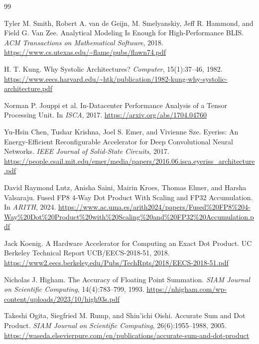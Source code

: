 \documentclass[UTF8,11pt,a4paper]{ctexart}
\begin{document}
\begin{thebibliography}{99}

Tyler M. Smith, Robert A. van de Geijn, M. Smelyanskiy, Jeff R. Hammond, and Field G. Van Zee.
\newblock Analytical Modeling Is Enough for High-Performance BLIS.
\newblock \emph{ACM Transactions on Mathematical Software}, 2018.
\newblock \url{https://www.cs.utexas.edu/~flame/pubs/flawn74.pdf}

H. T. Kung.
\newblock Why Systolic Architectures?
\newblock \emph{Computer}, 15(1):37--46, 1982.
\newblock \url{https://www.eecs.harvard.edu/~htk/publication/1982-kung-why-systolic-architecture.pdf}

Norman P. Jouppi et al.
\newblock In-Datacenter Performance Analysis of a Tensor Processing Unit.
\newblock In \emph{ISCA}, 2017.
\newblock \url{https://arxiv.org/abs/1704.04760}

Yu-Hsin Chen, Tushar Krishna, Joel S. Emer, and Vivienne Sze.
\newblock Eyeriss: An Energy-Efficient Reconfigurable Accelerator for Deep Convolutional Neural Networks.
\newblock \emph{IEEE Journal of Solid-State Circuits}, 2017.
\newblock \url{https://people.csail.mit.edu/emer/media/papers/2016.06.isca.eyeriss_architecture.pdf}

David Raymond Lutz, Anisha Saini, Mairin Kroes, Thomas Elmer, and Harsha Valsaraju.
\newblock Fused FP8 4-Way Dot Product With Scaling and FP32 Accumulation.
\newblock In \emph{ARITH}, 2024.
\newblock \url{https://www.ac.uma.es/arith2024/papers/Fused%20FP8%204-Way%20Dot%20Product%20with%20Scaling%20and%20FP32%20Accumulation.pdf}

Jack Koenig.
\newblock A Hardware Accelerator for Computing an Exact Dot Product.
\newblock UC Berkeley Technical Report UCB/EECS-2018-51, 2018.
\newblock \url{https://www2.eecs.berkeley.edu/Pubs/TechRpts/2018/EECS-2018-51.pdf}

Nicholas J. Higham.
\newblock The Accuracy of Floating Point Summation.
\newblock \emph{SIAM Journal on Scientific Computing}, 14(4):783--799, 1993.
\newblock \url{https://nhigham.com/wp-content/uploads/2023/10/high93s.pdf}

Takeshi Ogita, Siegfried M. Rump, and Shin'ichi Oishi.
\newblock Accurate Sum and Dot Product.
\newblock \emph{SIAM Journal on Scientific Computing}, 26(6):1955--1988, 2005.
\newblock \url{https://waseda.elsevierpure.com/en/publications/accurate-sum-and-dot-product}


\end{thebibliography}
\end{document}
